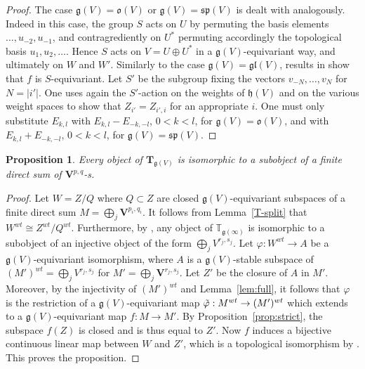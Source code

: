 \documentclass[12pt,reqno]{amsart}
\newtheorem{prop}[thm]{Proposition}
\theoremstyle{definition}
\theoremstyle{remark}
\begin{document}
\begin{proof}
 The case $\mathfrak{g}(V) = \mathfrak{o}(V)$ or $\mathfrak{g}(V) = \mathfrak{sp}(V)$ is dealt with analogously. Indeed in this case, the group $S$ acts on $U$ by permuting the basis elements $\ldots, u_{-2}, u_{-1}$, and contragrediently on $U^\ast$ permuting accordingly the topological basis $u_1, u_2 , \ldots$. Hence $S$ acts on $V = U\oplus U^\ast$ in a $\mathfrak{g}(V)$-equivariant way, and ultimately on $W$ and $W'$. Similarly to the case $\mathfrak{g}(V) = \mathfrak{gl}(V)$, results in \cite[Section 6]{DPS} show that $f$ is $S$-equivariant. Let $S'$ be the subgroup fixing the vectors $v_{-N}, \ldots, v_N$ for $N = |i'|$. One uses again the $S'$-action on the weights of $\mathfrak{h}(V)$ and on the various weight spaces to show that $Z_{i'} = Z_{i', i}$ for an appropriate $i$. One must only  substitute $E_{k,l}$ with $E_{k,l}-E_{-k, -l}$, $0<k <l$, for $\mathfrak{g}(V) = \mathfrak{o}(V)$, and with $E_{k,l}+E_{-k, -l}$, $0<k <l$, for $\mathfrak{g}(V) = \mathfrak{sp}(V)$.       
        \end{proof}

        \begin{prop}\label{prop:sub}
	Every object of $\mathbf{T}_{\mathfrak{g}(V)}$ is isomorphic to a subobject of a finite direct sum of $\mathbf{V}^{p,q}$-s.
	\end{prop}

        \begin{proof}
            Let $W = Z/Q$ where $Q\subset Z$ are closed $\mathfrak{g}(V)$-equivariant subspaces of a finite direct sum $M = \bigoplus_j \mathbf{V}^{p_i,q_i} $. It follows from Lemma~\ref{T-split} that $W^{wt}\cong Z^{wt}/Q^{wt}$. Furthermore, by \cite[Proposition 4.5]{DPS}, any object of $\mathbb{T}_{\mathfrak{g}(\infty)}$ is isomorphic to a subobject of an injective object of the form $\bigoplus_j V^{r_j,s_j} $. Let $\varphi: W^{wt}\rightarrow A$ be a $\mathfrak{g}(V)$-equivariant isomorphism, where $A$ is a $\mathfrak{g}(V)$-stable subspace of 
	$( M' ) ^{wt}= \bigoplus_j V^{r_j,s_j} $  for $M' = \bigoplus_j \mathbf{V}^{r_j,s_j} $. Let $Z'$ be the closure of $A$ in $M'$. Moreover, by the injectivity of $( M' ) ^{wt} $ and Lemma~\ref{lem:full}, it follows that $\varphi$ is the restriction of a $\mathfrak{g}(V)$-equivariant map $\Tilde{\varphi}: M^{wt} \rightarrow (M')^{wt}$ which extends to a 
	$\mathfrak{g}(V)$-equivariant map $f: M \rightarrow M'$. By Proposition~\ref{prop:strict}, the subspace $f(Z)$ is closed and is thus equal to $Z'$. Now $f$ induces a bijective continuous linear map between $W$ and $Z'$, which is a topological isomorphism by \cite[Lemma~2.7(a)]{EP}. This proves the proposition.
        \end{proof}
        
\end{document}
